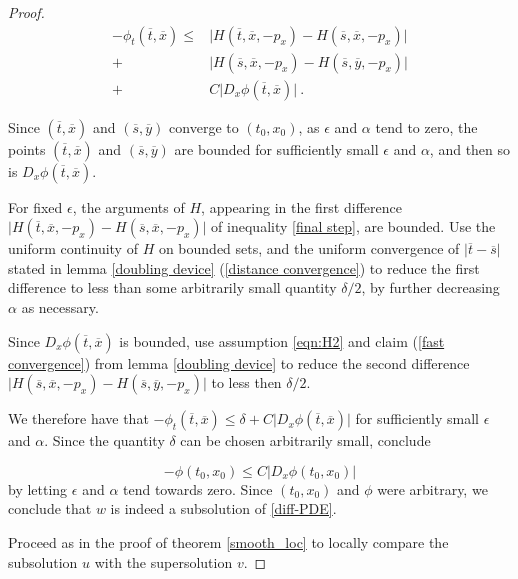 \begin{theorem}
\begin{proof}
		  		\begin{equation}
		  		\label{final step}
		  			\begin{split}
		  				- \phi_t(\overline{t}, \overline{x}) \leq
		  				&\lvert H(\overline{t}, \overline{x}, -p_x) - H(\overline{s}, \overline{x}, -p_x) \rvert \\
		  				+&\lvert H(\overline{s}, \overline{x}, -p_x) - H(\overline{s}, \overline{y}, -p_x) \rvert \\
		  				+& C \lvert D_x \phi(\overline{t}, \overline{x}) \rvert \ .
		  			\end{split}
		  		\end{equation}
		  		
		  		Since $ (\overline{t}, \overline{x}) $ and $ (\overline{s}, \overline{y}) $ converge to $ (t_0, x_0) $, as $ \epsilon $ and $ \alpha $ tend to zero, the points $ (\overline{t}, \overline{x}) $ and $ (\overline{s}, \overline{y}) $ are bounded for sufficiently small $ \epsilon $ and $ \alpha $, and then so is $ D_x \phi(\overline{t}, \overline{x}) $.
		  		
		  		For fixed $ \epsilon $, the arguments of $ H $, appearing in the first difference $ \lvert H(\overline{t}, \overline{x}, -p_x) - H(\overline{s}, \overline{x}, -p_x) \rvert $ of inequality \ref{final step}, 
		  		are bounded. Use the uniform continuity of $ H $ on bounded sets, and the uniform convergence of $ \lvert \overline{t} - \overline{s} \rvert $ stated in lemma \ref{doubling device} (\ref{distance convergence}) to reduce the first difference to less than some arbitrarily small quantity $ \delta / 2 $, by further decreasing $ \alpha $ as necessary.
		  		
		  		Since $ D_x \phi(\overline{t}, \overline{x}) $ is bounded, use assumption \eqref{eqn:H2} and claim (\ref{fast convergence}) from lemma \ref{doubling device} to reduce the second difference $ \lvert H(\overline{s}, \overline{x}, -p_x) - H(\overline{s}, \overline{y}, -p_x) \rvert $ to less then $ \delta / 2 $.
		  		
		  		We therefore have that $ -\phi_t(\overline{t}, \overline{x}) \leq \delta + C \lvert D_x \phi(\overline{t}, \overline{x}) \rvert $ for sufficiently small $ \epsilon $ and $ \alpha $. Since the quantity $ \delta $ can be chosen arbitrarily small, conclude 
		  		
		  		\begin{equation*}
		  			- \phi(t_0, x_0) \leq C \lvert D_x \phi(t_0, x_0) \rvert
		  		\end{equation*}
		  		by letting $ \epsilon $ and $ \alpha $ tend towards zero. Since $ (t_0, x_0) $ and $ \phi $ were arbitrary, we conclude that $ w $ is indeed a subsolution of \ref{diff-PDE}.
		  		
		  		Proceed as in the proof of theorem \ref{smooth_loc} to locally compare the subsolution $ u $ with the supersolution $ v $.
		  	\end{proof}
		  \end{theorem}